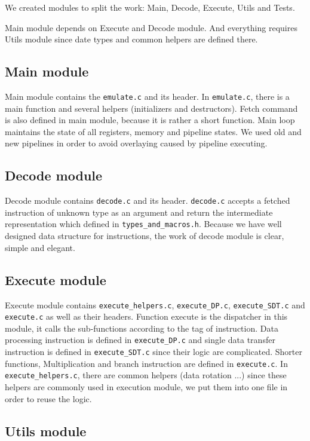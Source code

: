 \documentclass[10pt]{article}
\begin{document}
	We created modules to split the work: Main, Decode, Execute, Utils and Tests.

	Main module depends on Execute and Decode module. And everything requires Utils module since date types and common helpers are defined there.

  \subsection{Main module}

	Main module contains the \texttt{emulate.c} and its header. In \texttt{emulate.c}, there is a main function and several helpers (initializers and destructors). Fetch command is also defined in main module, because it is rather a short function. Main loop maintains the state of all registers, memory and pipeline states. We used old and new pipelines in order to avoid overlaying caused by pipeline executing.

  \subsection{Decode module}

	Decode module contains \texttt{decode.c} and its header. \texttt{decode.c} accepts a fetched instruction of unknown type as an argument and return the intermediate representation which defined in \texttt{types\_and\_macros.h}. Because we have well designed data structure for instructions, the work of decode module is clear, simple and elegant.

  \subsection{Execute module}

	Execute module contains \texttt{execute\_helpers.c}, \texttt{execute\_DP.c}, \texttt{execute\_SDT.c} and \texttt{execute.c} as well as their headers. Function execute is the dispatcher in this module, it calls the sub-functions according to the tag of instruction. Data processing instruction is defined in \texttt{execute\_DP.c} and single data transfer instruction is defined in \texttt{execute\_SDT.c} since their logic are complicated. Shorter functions, Multiplication and branch instruction are defined in \texttt{execute.c}. In \texttt{execute\_helpers.c}, there are common helpers (data rotation ...) since these helpers are commonly used in execution module, we put them into one file in order to reuse the logic.

  \subsection{Utils module}
\end{document}
